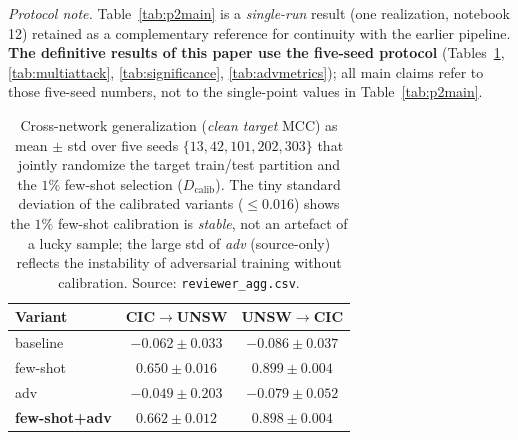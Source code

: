 \documentclass[preprint,12pt,authoryear]{elsarticle}
\begin{document}
\noindent\emph{Protocol note.} Table~\ref{tab:p2main} is a \emph{single-run} result (one realization, notebook 12) retained as a complementary reference for continuity with the earlier pipeline. \textbf{The definitive results of this paper use the five-seed protocol} (Tables~\ref{tab:fewshot_seeds}, \ref{tab:multiattack}, \ref{tab:significance}, \ref{tab:advmetrics}); all main claims refer to those five-seed numbers, not to the single-point values in Table~\ref{tab:p2main}.

\begin{table}[h]
\centering
\caption{Cross-network generalization (\emph{clean target} MCC) as mean $\pm$ std
over five seeds $\{13,42,101,202,303\}$ that jointly randomize the target
train/test partition and the $1\%$ few-shot selection ($D_{\text{calib}}$). The tiny
standard deviation of the calibrated variants ($\le 0.016$) shows the $1\%$
few-shot calibration is \emph{stable}, not an artefact of a lucky sample; the large
std of \emph{adv} (source-only) reflects the instability of adversarial training
without calibration. Source: \texttt{reviewer\_agg.csv}.}
\label{tab:fewshot_seeds}
\small
\begin{tabular}{lcc}
\toprule
Variant & CIC$\rightarrow$UNSW & UNSW$\rightarrow$CIC \\
\midrule
baseline              & $-0.062 \pm 0.033$ & $-0.086 \pm 0.037$ \\
few-shot              & $0.650 \pm 0.016$ & $\mathbf{0.899 \pm 0.004}$ \\
adv                   & $-0.049 \pm 0.203$ & $-0.079 \pm 0.052$ \\
\textbf{few-shot+adv} & $\mathbf{0.662 \pm 0.012}$ & $0.898 \pm 0.004$ \\
\bottomrule
\end{tabular}
\end{table}
\end{document}
